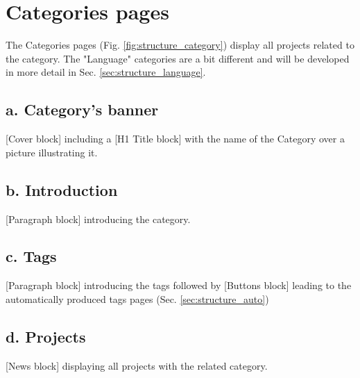 \newpage

\section{Categories pages}\label{sec:structure_categories}

The Categories pages (Fig. \ref{fig:structure_category}) display all projects related to the category. The "Language" categories are a bit different and will be developed in more detail in Sec. \ref{sec:structure_language}.

\subsection*{a. Category's banner}
[Cover block] including a [H1 Title block] with the name of the Category over a picture illustrating it.

\subsection*{b. Introduction}
[Paragraph block] introducing the category.

\subsection*{c. Tags}
[Paragraph block] introducing the tags followed by [Buttons block] leading to the automatically produced tags pages (Sec. \ref{sec:structure_auto})

\subsection*{d. Projects}
[News block] displaying all projects with the related category.

